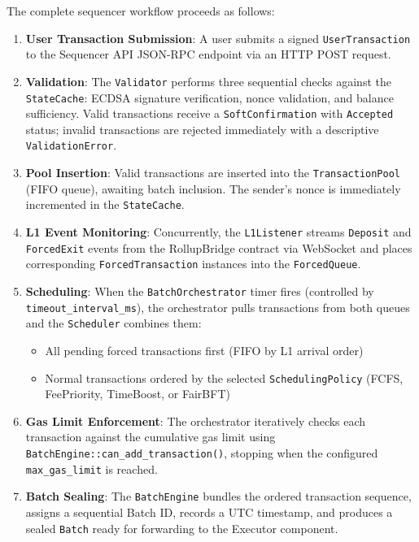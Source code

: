 The complete sequencer workflow proceeds as follows:

\begin{enumerate}
    \item \textbf{User Transaction Submission}: A user submits a signed \texttt{UserTransaction} to the Sequencer API JSON-RPC endpoint via an HTTP POST request.
    
    \item \textbf{Validation}: The \texttt{Validator} performs three sequential checks against the \texttt{StateCache}: ECDSA signature verification, nonce validation, and balance sufficiency. Valid transactions receive a \texttt{SoftConfirmation} with \texttt{Accepted} status; invalid transactions are rejected immediately with a descriptive \texttt{ValidationError}.
    
    \item \textbf{Pool Insertion}: Valid transactions are inserted into the \texttt{TransactionPool} (FIFO queue), awaiting batch inclusion. The sender's nonce is immediately incremented in the \texttt{StateCache}.
    
    \item \textbf{L1 Event Monitoring}: Concurrently, the \texttt{L1Listener} streams \texttt{Deposit} and \texttt{ForcedExit} events from the RollupBridge contract via WebSocket and places corresponding \texttt{ForcedTransaction} instances into the \texttt{ForcedQueue}.
    
    \item \textbf{Scheduling}: When the \texttt{BatchOrchestrator} timer fires (controlled by \texttt{timeout\_interval\_ms}), the orchestrator pulls transactions from both queues and the \texttt{Scheduler} combines them:
    \begin{itemize}
        \item All pending forced transactions first (FIFO by L1 arrival order)
        \item Normal transactions ordered by the selected \texttt{SchedulingPolicy} (FCFS, FeePriority, TimeBoost, or FairBFT)
    \end{itemize}
    
    \item \textbf{Gas Limit Enforcement}: The orchestrator iteratively checks each transaction against the cumulative gas limit using \texttt{BatchEngine::can\_add\_transaction()}, stopping when the configured \texttt{max\_gas\_limit} is reached.
    
    \item \textbf{Batch Sealing}: The \texttt{BatchEngine} bundles the ordered transaction sequence, assigns a sequential Batch ID, records a UTC timestamp, and produces a sealed \texttt{Batch} ready for forwarding to the Executor component.
\end{enumerate}

